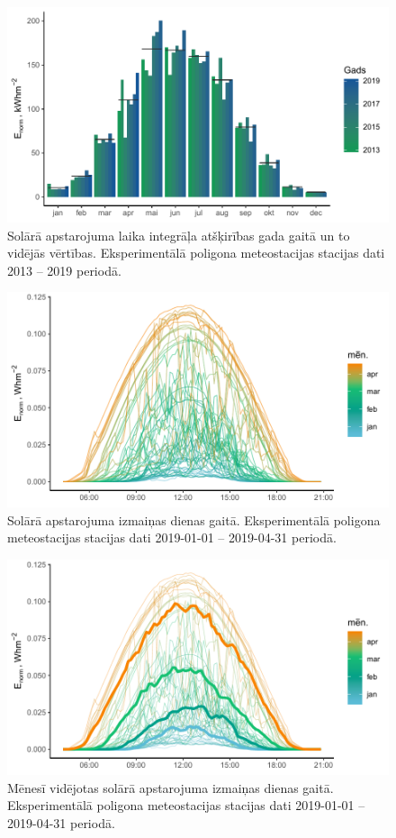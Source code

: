 \begin{figure}[h]
    \centering
    \includegraphics[width=\linewidth]{figures/meteo/meanYears.pdf}
    \caption{Solārā apstarojuma laika integrāļa atšķirības gada gaitā un to vidējās vērtības. Eksperimentālā poligona meteostacijas stacijas dati 2013 -- 2019 periodā.}
    \label{fig:metYears_mean}
\end{figure}
\begin{figure}[h]
    \centering
    \includegraphics[width=\linewidth]{figures/meteo/sun19.pdf}
    \caption{Solārā apstarojuma izmaiņas dienas gaitā. Eksperimentālā poligona meteostacijas stacijas dati 2019-01-01 -- 2019-04-31 periodā.}
    \label{fig:met_Irrad}
\end{figure}
\begin{figure}[h]
    \centering
    \includegraphics[width=\linewidth]{figures/meteo/mean19.pdf}
    \caption{Mēnesī vidējotas solārā apstarojuma izmaiņas dienas gaitā. Eksperimentālā poligona meteostacijas stacijas dati 2019-01-01 -- 2019-04-31 periodā.}
    \label{fig:met_Irrad_mean}
\end{figure}